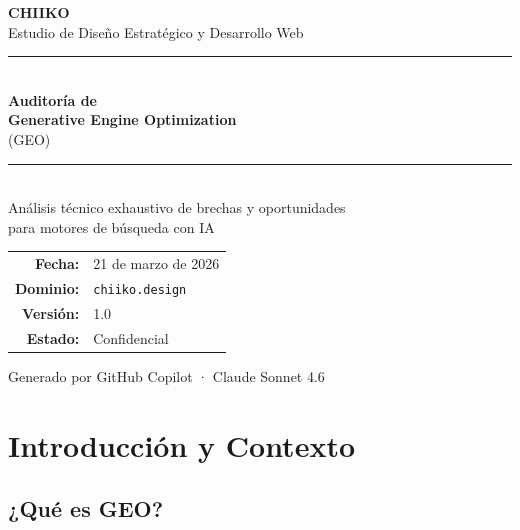 \documentclass[12pt, a4paper]{article}
\begin{document}
\begin{titlepage}
  \pagecolor{chiiko}
  \color{white}
  \vspace*{3cm}
  \begin{center}
    {\fontsize{40}{48}\selectfont\bfseries CHIIKO}\\[0.4cm]
    {\Large\color{accent!80!white} Estudio de Diseño Estratégico y Desarrollo Web}\\[2cm]
    \rule{0.6\linewidth}{0.8pt}\\[1cm]
    {\fontsize{22}{28}\selectfont\bfseries Auditoría de\\[0.3cm]
    Generative Engine Optimization}\\[0.5cm]
    {\large (GEO)}\\[1cm]
    \rule{0.6\linewidth}{0.8pt}\\[1.5cm]
    {\large Análisis técnico exhaustivo de brechas y oportunidades\\
    para motores de búsqueda con IA}\\[2cm]
    {\normalsize
      \begin{tabular}{rl}
        \textbf{Fecha:}     & 21 de marzo de 2026 \\[4pt]
        \textbf{Dominio:}   & \texttt{chiiko.design} \\[4pt]
        \textbf{Versión:}   & 1.0 \\[4pt]
        \textbf{Estado:}    & Confidencial
      \end{tabular}
    }
  \end{center}
  \vfill
  \begin{center}
    \small\color{gray!60!white}
    Generado por GitHub Copilot · Claude Sonnet 4.6
  \end{center}
\end{titlepage}
\nopagecolor

\tableofcontents
\newpage

\section{Introducción y Contexto}

\subsection{¿Qué es GEO?}
\end{document}
